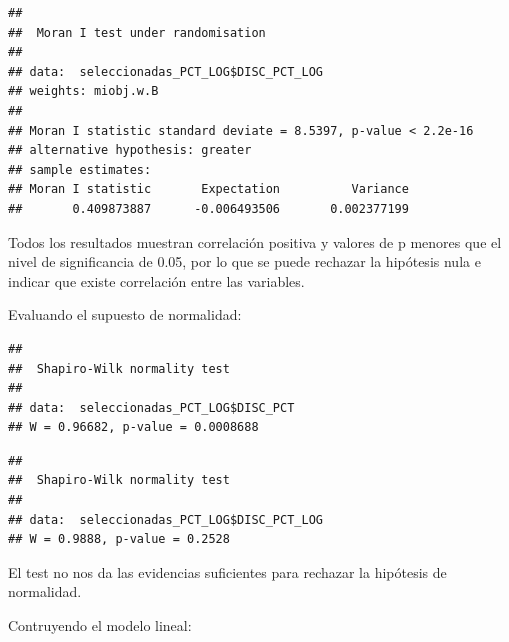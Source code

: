 \documentclass[11pt,]{article}
\begin{document}
\begin{verbatim}
## 
##  Moran I test under randomisation
## 
## data:  seleccionadas_PCT_LOG$DISC_PCT_LOG  
## weights: miobj.w.B    
## 
## Moran I statistic standard deviate = 8.5397, p-value < 2.2e-16
## alternative hypothesis: greater
## sample estimates:
## Moran I statistic       Expectation          Variance 
##       0.409873887      -0.006493506       0.002377199
\end{verbatim}

Todos los resultados muestran correlación positiva y valores de p
menores que el nivel de significancia de 0.05, por lo que se puede
rechazar la hipótesis nula e indicar que existe correlación entre las
variables.

Evaluando el supuesto de normalidad:

\begin{verbatim}
## 
##  Shapiro-Wilk normality test
## 
## data:  seleccionadas_PCT_LOG$DISC_PCT
## W = 0.96682, p-value = 0.0008688
\end{verbatim}

\begin{verbatim}
## 
##  Shapiro-Wilk normality test
## 
## data:  seleccionadas_PCT_LOG$DISC_PCT_LOG
## W = 0.9888, p-value = 0.2528
\end{verbatim}

El test no nos da las evidencias suficientes para rechazar la hipótesis
de normalidad.

Contruyendo el modelo lineal:
\end{document}
